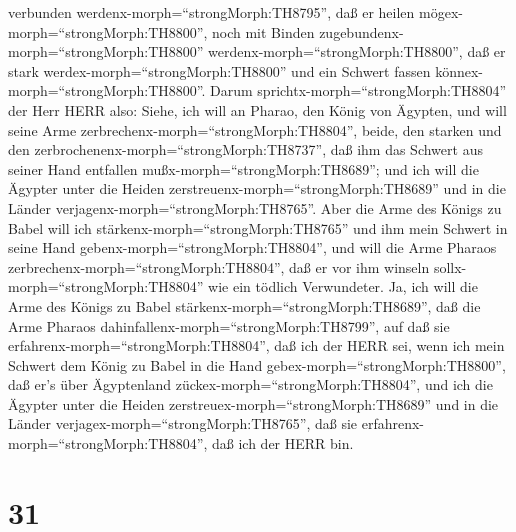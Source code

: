 verbunden werdenx-morph=``strongMorph:TH8795'', daß er heilen
mögex-morph=``strongMorph:TH8800'', noch mit Binden
zugebundenx-morph=``strongMorph:TH8800''
werdenx-morph=``strongMorph:TH8800'', daß er stark
werdex-morph=``strongMorph:TH8800'' und ein Schwert fassen
könnex-morph=``strongMorph:TH8800''.  Darum
sprichtx-morph=``strongMorph:TH8804'' der Herr HERR also: Siehe, ich
will an Pharao, den König von Ägypten, und will seine Arme
zerbrechenx-morph=``strongMorph:TH8804'', beide, den starken und den
zerbrochenenx-morph=``strongMorph:TH8737'', daß ihm das Schwert aus
seiner Hand entfallen mußx-morph=``strongMorph:TH8689''; 
und ich will die Ägypter unter die Heiden
zerstreuenx-morph=``strongMorph:TH8689'' und in die Länder
verjagenx-morph=``strongMorph:TH8765''.  Aber die Arme des
Königs zu Babel will ich stärkenx-morph=``strongMorph:TH8765'' und ihm
mein Schwert in seine Hand gebenx-morph=``strongMorph:TH8804'', und will
die Arme Pharaos zerbrechenx-morph=``strongMorph:TH8804'', daß er vor
ihm winseln sollx-morph=``strongMorph:TH8804'' wie ein tödlich
Verwundeter.  Ja, ich will die Arme des Königs zu Babel
stärkenx-morph=``strongMorph:TH8689'', daß die Arme Pharaos
dahinfallenx-morph=``strongMorph:TH8799'', auf daß sie
erfahrenx-morph=``strongMorph:TH8804'', daß ich der HERR sei, wenn ich
mein Schwert dem König zu Babel in die Hand
gebex-morph=``strongMorph:TH8800'', daß er's über Ägyptenland
zückex-morph=``strongMorph:TH8804'',  und ich die Ägypter
unter die Heiden zerstreuex-morph=``strongMorph:TH8689'' und in die
Länder verjagex-morph=``strongMorph:TH8765'', daß sie
erfahrenx-morph=``strongMorph:TH8804'', daß ich der HERR bin.

\hypertarget{section-30}{%
\section{31}\label{section-30}}

